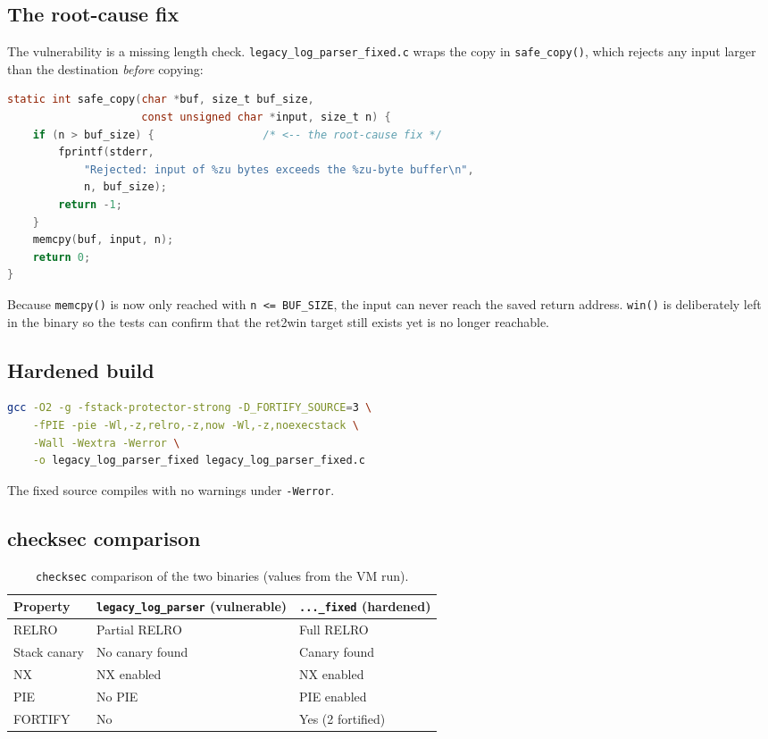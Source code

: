\documentclass[11pt]{article}
\newcommand{\file}[1]{\texttt{#1}}
\begin{document}
\subsection{The root-cause fix}
The vulnerability is a missing length check. \file{legacy\_log\_parser\_fixed.c}
wraps the copy in \texttt{safe\_copy()}, which rejects any input larger than the
destination \emph{before} copying:

\begin{lstlisting}[language=C]
static int safe_copy(char *buf, size_t buf_size,
                     const unsigned char *input, size_t n) {
    if (n > buf_size) {                 /* <-- the root-cause fix */
        fprintf(stderr,
            "Rejected: input of %zu bytes exceeds the %zu-byte buffer\n",
            n, buf_size);
        return -1;
    }
    memcpy(buf, input, n);
    return 0;
}
\end{lstlisting}

Because \texttt{memcpy()} is now only reached with \texttt{n <= BUF\_SIZE}, the
input can never reach the saved return address. \texttt{win()} is deliberately
left in the binary so the tests can confirm that the ret2win target still
exists yet is no longer reachable.

\subsection{Hardened build}
\begin{lstlisting}[language=bash]
gcc -O2 -g -fstack-protector-strong -D_FORTIFY_SOURCE=3 \
    -fPIE -pie -Wl,-z,relro,-z,now -Wl,-z,noexecstack \
    -Wall -Wextra -Werror \
    -o legacy_log_parser_fixed legacy_log_parser_fixed.c
\end{lstlisting}
The fixed source compiles with no warnings under \texttt{-Werror}.

\subsection{checksec comparison}
\begin{table}[H]
\centering\small
\begin{tabular}{lll}
\toprule
\textbf{Property} & \textbf{\texttt{legacy\_log\_parser}} (vulnerable) & \textbf{\texttt{..._fixed}} (hardened)\\
\midrule
RELRO        & Partial RELRO   & Full RELRO \\
Stack canary & No canary found & Canary found \\
NX           & NX enabled      & NX enabled \\
PIE          & No PIE          & PIE enabled \\
FORTIFY      & No              & Yes (2 fortified) \\
\bottomrule
\end{tabular}
\caption{\texttt{checksec} comparison of the two binaries (values from the VM run).}
\end{table}
\end{document}
